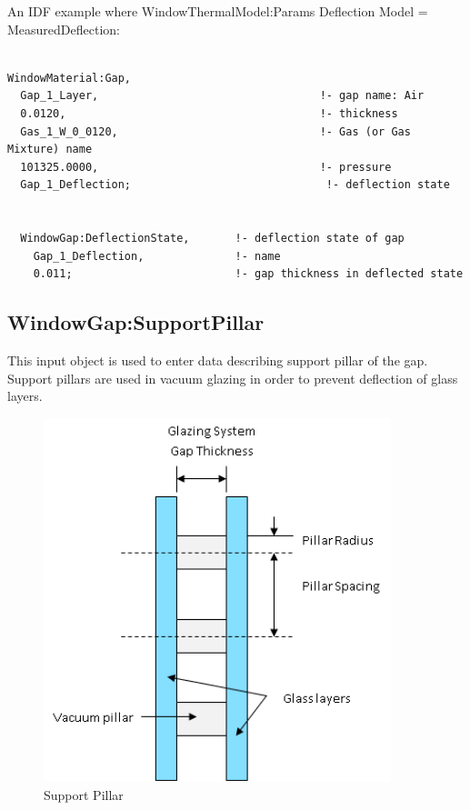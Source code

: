 An IDF example where WindowThermalModel:Params Deflection Model = MeasuredDeflection:

\begin{lstlisting}

WindowMaterial:Gap,
  Gap_1_Layer,                                  !- gap name: Air
  0.0120,                                       !- thickness
  Gas_1_W_0_0120,                               !- Gas (or Gas Mixture) name
  101325.0000,                                  !- pressure
  Gap_1_Deflection;                              !- deflection state


  WindowGap:DeflectionState,       !- deflection state of gap
    Gap_1_Deflection,              !- name
    0.011;                         !- gap thickness in deflected state
\end{lstlisting}

\subsection{WindowGap:SupportPillar}\label{windowgapsupportpillar}

This input object is used to enter data describing support pillar of the gap.~ Support pillars are used in vacuum glazing in order to prevent deflection of glass layers.

\begin{figure}[hbtp] %
\centering
\includegraphics[width=0.9\textwidth, height=0.9\textheight, keepaspectratio=true]{media/image029.png}
\caption{Support Pillar \protect \label{fig:support-pillar}}
\end{figure}

